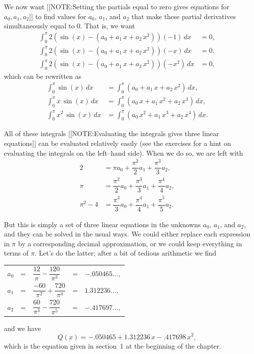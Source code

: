 We now want 
        [[NOTE:Setting the partials equal to zero gives equations for $a_0, a_1, a_2$]]
to find values for $a_0$, $a_1$, and $a_2$ that make these partial derivatives simultaneously equal to 0.  That is, we want
\begin{align*}
\int_0^{\pi}2\left( \sin(x) - (a_0 + a_1\,x + a_2\,x^2)\right)(-1) \, dx 
   &= 0, \\[.15in]
\int_0^{\pi}2\left( \sin(x) - (a_0 + a_1\,x + a_2\,x^2)\right)(-x) \, dx 
   &= 0, \\[.15in]
\int_0^{\pi}2\left( \sin(x) - (a_0 + a_1\,x + a_2\,x^2)\right)(-x^2) \, dx 
   &= 0,
\end{align*}
which can be rewritten as
\begin{align*}
\int_0^{\pi}\sin(x) \, dx
  &= \int_0^{\pi}\left( a_0 + a_1\,x + a_2\,x^2\right)\, dx,  \\[.15in]
\int_0^{\pi}x\,\sin(x) \, dx
  &= \int_0^{\pi}\left(a_0\,x + a_1\,x^2 + a_2\,x^3\right) \, dx,  \\[.15in]
\int_0^{\pi}x^2\,\sin(x) \, dx
  &= \int_0^{\pi}\left( a_0\,x^2 + a_1\,x^3 + a_2\,x^4\right) \, dx.
\end{align*}

All of these integrals 
        [[NOTE:Evaluating the integrals gives three linear equations]]
can be evaluated relatively easily (see the exercises for a hint on evaluating the integrals on the left--hand side).  When we do so, we are left with 
\begin{align*}
        2 &= \pi a_0 + \dfrac{\pi^2}{2}a_1 + \dfrac{\pi^3}{3}a_2,  \\[3pt]
      \pi &=\dfrac{\pi^2}{2}a_0 + \dfrac{\pi^3}{3}a_1 + 
             \dfrac{\pi^4}{4}a_2, \\[5pt]
\pi^2 - 4 &= \dfrac{\pi^3}{3}a_0 + \dfrac{\pi^4}{4}a_1 
             + \dfrac{\pi^5}{5}a_2. 
\end{align*}

But this is simply a set of three linear equations in the unknowns
$a_0$, $a_1$, and $a_2$, and they can be solved in the usual ways.  We
could either replace each expression in $\pi$ by a corresponding
decimal approximation, or we could keep everything in terms of $\pi$.
Let's do the latter; after a bit of tedious arithmetic we find
\addtolength{\tabcolsep}{-3pt}%

\begin{center}
\begin{tabular}{rclcl}
$a_0 $&=& $\dfrac{12}{\pi}-\dfrac{120}{\pi^3}$&=& $-.050465\ldots ,$ \\ [.15in]
$a_1 $&=& $\dfrac{-60}{\pi^2}+\dfrac{720}{\pi^4}$&=& $1.312236\ldots ,$ \\ [.15in]
$a_2 $&=& $\dfrac{60}{\pi^3}-\dfrac{720}{\pi^5}$&=& $-.417697\ldots ,$ \\ [.15in]
\end{tabular}
\end{center}
\addtolength{\tabcolsep}{3pt}%
and we have
\[
Q(x) = -.050465 +1.312236\,x-.417698\,x^2,
\]
which is the equation given in section~1 at the beginning of the chapter.

